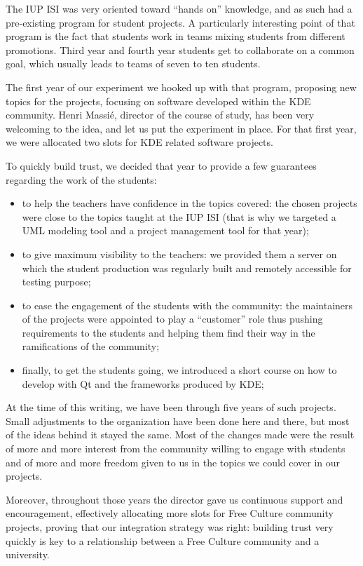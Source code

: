 The IUP ISI was very oriented toward ``hands on'' knowledge, and as such had a
pre-existing program for student projects. A particularly interesting point of
that program is the fact that students work in teams mixing students from
different promotions. Third year and fourth year students get to collaborate on
a common goal, which usually leads to teams of seven to ten students.

The first year of our experiment we hooked up with that program, proposing new
topics for the projects, focusing on software developed within the KDE
community. Henri Massié, director of the course of study, has been very
welcoming to the idea, and let us put the experiment in place. For that first
year, we were allocated two slots for KDE related software projects.

To quickly build trust, we decided that year to provide a few guarantees
regarding the work of the students:
\begin{itemize}
  \item to help the teachers have confidence in the topics covered: the chosen
projects were close to the topics taught at the IUP ISI (that is why we
targeted a UML modeling tool and a project management tool for that year);
  \item to give maximum visibility to the teachers: we provided them a server on
which the student production was regularly built and remotely accessible for
testing purpose;
  \item to ease the engagement of the students with the community: the
maintainers of the projects were appointed to play a ``customer'' role thus
pushing requirements to the students and helping them find their way in the
ramifications of the community;
  \item finally, to get the students going, we introduced a short course on how
to develop with Qt and the frameworks produced by KDE;
\end{itemize}

At the time of this writing, we have been through five years of such projects.
Small adjustments to the organization have been done here and there, but most of
the ideas behind it stayed the same. Most of the changes made were the result of
more and more interest from the community willing to engage with students and
of more and more freedom given to us in the topics we could cover in our
projects.

Moreover, throughout those years the director gave us continuous support and
encouragement, effectively allocating more slots for Free Culture community
projects, proving that our integration strategy was right: building trust very
quickly is key to a relationship between a Free Culture community and a
university.

